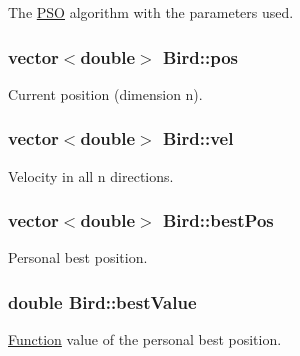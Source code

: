 The \hyperlink{classPSO}{PSO} algorithm with the parameters used. 

\hypertarget{classBird_61cf7cbf8d338c6c1f6659935fb1c8e6}{
\subsubsection{\setlength{\rightskip}{0pt plus 5cm}vector$<$double$>$ {\bf Bird::pos}}}
\label{classBird_61cf7cbf8d338c6c1f6659935fb1c8e6}


Current position (dimension n). 

\hypertarget{classBird_51759f7c33635ab004999f3ed659166d}{
\subsubsection{\setlength{\rightskip}{0pt plus 5cm}vector$<$double$>$ {\bf Bird::vel}}}
\label{classBird_51759f7c33635ab004999f3ed659166d}


Velocity in all n directions. 

\hypertarget{classBird_f3eff900924ce8434ca73e0e98b699a0}{
\subsubsection{\setlength{\rightskip}{0pt plus 5cm}vector$<$double$>$ {\bf Bird::bestPos}}}
\label{classBird_f3eff900924ce8434ca73e0e98b699a0}


Personal best position. 

\hypertarget{classBird_5a4c53e148fe7fd7c75d2ea0d9c4afaf}{
\subsubsection{\setlength{\rightskip}{0pt plus 5cm}double {\bf Bird::bestValue}}}
\label{classBird_5a4c53e148fe7fd7c75d2ea0d9c4afaf}


\hyperlink{classFunction}{Function} value of the personal best position. 


